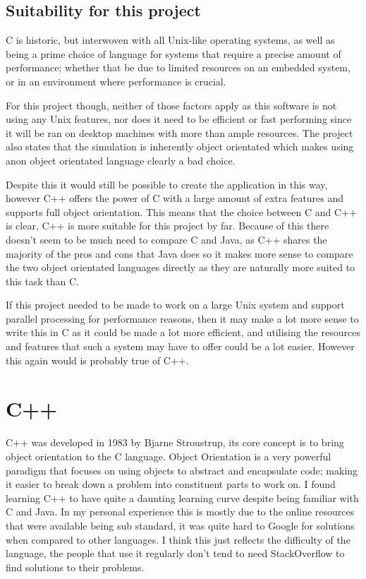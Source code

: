 \documentclass[10pt]{article}
\begin{document}
  \subsection{Suitability for this project}
  C is historic, but interwoven with all Unix-like operating systems, as well as being a prime choice of language for systems that require a precise amount of performance; whether that be due to limited resources on an embedded system, or in an environment where performance is crucial.

  For this project though, neither of those factors apply as this software is not using any Unix features, nor does it need to be efficient or fast performing since it will be ran on desktop machines with more than ample resources. The project also states that the simulation is inherently object orientated\cite{assignment1} which makes using anon object orientated language clearly a bad choice. 

  Despite this it would still be possible to create the application in this way, however C++ offers the power of C with a large amount of extra features and supports full object orientation. This means that the choice between C and C++ is clear, C++ is more suitable for this project by far. Because of this there doesn't seem to be much need to compare C and Java, as C++ shares the majority of the pros and cons that Java does so it makes more sense to compare the two object orientated languages directly as they are naturally more suited to this task than C. 

  If this project needed to be made to work on a large Unix system and support parallel processing for performance reasons, then it may make a lot more sense to write this in C as it could be made a lot more efficient, and utilising the resources and features that such a system may have to offer could be a lot easier. However this again would is probably true of C++.

  \section{C++}
  C++ was developed in 1983 by Bjarne Stroustrup, its core concept is to bring object orientation to the C language. Object Orientation is a very powerful paradigm that focuses on using objects to abstract and encapsulate code; making it easier to break down a problem into constituent parts to work on. I found learning C++ to have quite a daunting learning curve despite being familiar with C and Java. In my personal experience this is mostly due to the online resources that were available being sub standard, it was quite hard to Google for solutions when compared to other languages. I think this just reflects the difficulty of the language, the people that use it regularly don't tend to need StackOverflow to find solutions to their problems. 
\end{document}
